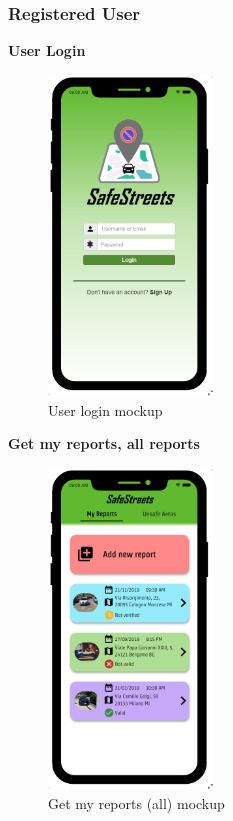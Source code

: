 				\subsubsection{Registered User}
					\begin{center}
						{\small \textbf{User Login}}
					\end{center}
					\vspace{-5mm}
					\begin{figure}[!h]
						\centering
						\includegraphics[height=8.5cm]{images/MockUp/User/UserLogin.pdf}
						\caption{User login mockup}
					\end{figure}
					\vspace{-1mm}
					\begin{center}
						{\small \textbf{Get my reports, all reports}}
					\end{center}
					\vspace{-5mm}
					\begin{figure}[!h]
						\centering
						\includegraphics[height=8.5cm]{images/MockUp/User/MyReports.pdf}
						\caption{Get my reports (all) mockup}
					\end{figure}
					\clearpage
					
